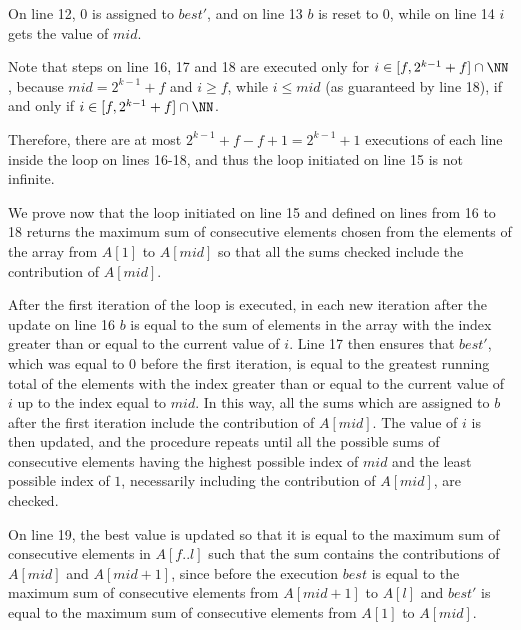 \documentclass[11pt]{scrartcl}
\begin{document}
On line 12, 0 is assigned to $best'$, and on line 13 $b$ is reset to 0, while on line 14 $i$ gets the value of $mid$.

Note that steps on line 16, 17 and 18 are executed only for $i\in[f, 2^{k-1} +f]\cap\NN$, because $mid = 2^{k-1}+f$ and $i\geq f$, while $i\leq mid$ (as guaranteed by line 18), if and only if $i\in[f, 2^{k-1} +f]\cap\NN$.

Therefore, there are at most $2^{k-1} +f- f + 1 = 2^{k-1} +1$
executions of each line inside the loop on lines 16-18, and thus the
loop initiated on line 15 is not infinite.

We prove now that the loop initiated on line 15 and defined on lines from 16 to 18 returns the maximum sum of consecutive elements chosen from the elements of the array from $A[1]$ to $A[mid]$ so that all the sums checked include the contribution of $A[mid]$.

After the first iteration of the loop is executed, in each new
iteration after the update on line 16 $b$ is equal to the sum of
elements in the array with the index greater than or equal to the
current value of $i$. Line 17 then ensures that $best'$, which was
equal to 0 before the first iteration, is equal to the greatest
running total of the elements with the index greater than or equal to
the current value of $i$ up to the index equal to $mid$. In this way,
all the sums which are assigned to $b$ after the first iteration
include the contribution of $A[mid]$. The value of $i$ is then
updated, and the procedure repeats until all the possible sums of
consecutive elements having the highest possible index of $mid$ and
the least possible index of $1$, necessarily including the
contribution of $A[mid]$, are checked.

On line 19, the best value is updated so that it is equal to the
maximum sum of consecutive elements in $A[f..l]$ such that the sum
contains the contributions of $A[mid]$ and $A[mid+1]$, since before
the execution $best$ is equal to the maximum sum of consecutive
elements from $A[mid+1]$ to $A[l]$ and $best'$ is equal to the maximum
sum of consecutive elements from $A[1]$ to $A[mid]$.
\end{document}
